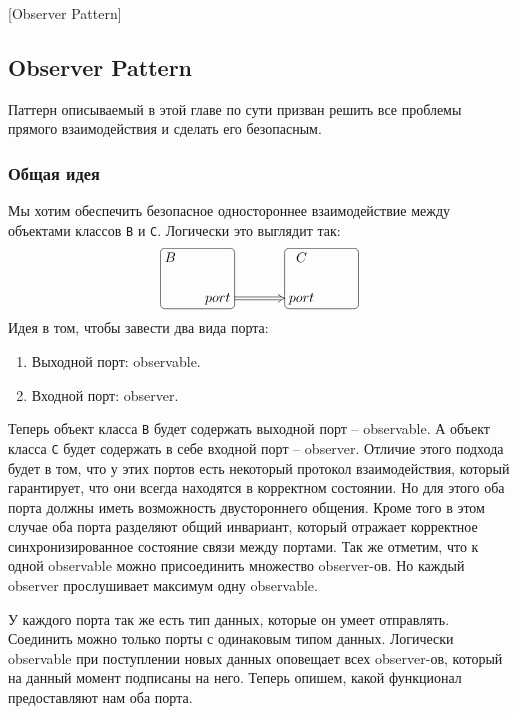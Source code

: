 [Observer Pattern]


\subsection{Observer Pattern}
\label{section::Observer}

Паттерн описываемый в этой главе по сути призван решить все проблемы прямого взаимодействия и сделать его безопасным.

\subsubsection{Общая идея}

Мы хотим обеспечить безопасное одностороннее взаимодействие между объектами классов \verb"B" и \verb"C".
Логически это выглядит так:
\[
\xymatrix@R=15pt@C=15pt{
	{B}
	{
	\save
   [].[rd]*[F-:<3pt>]\frm{}
   \restore
	}
	&{}&{}&{C}
	&{\phantom{C}}\\
	{}&{port}\ar@{=>}[rr]%
	&{}&{port}
	{
	\save
   [].[ru]*[F-:<3pt>]\frm{}
   \restore
	}	
	&{}\\
}
\]
Идея в том, чтобы завести два вида порта:
\begin{enumerate}
\item Выходной порт: observable.

\item Входной порт: observer.
\end{enumerate}
Теперь объект класса \verb"B" будет содержать выходной порт -- observable.
А объект класса \verb"C" будет содержать в себе входной порт -- observer.
Отличие этого подхода будет в том, что у этих портов есть некоторый протокол взаимодействия, который гарантирует, что они всегда находятся в корректном состоянии.
Но для этого оба порта должны иметь возможность двустороннего общения.
Кроме того в этом случае оба порта разделяют общий инвариант, который отражает корректное синхронизированное состояние связи между портами.
Так же отметим, что к одной observable можно присоединить множество observer-ов.
Но каждый observer прослушивает максимум одну observable.

У каждого порта так же есть тип данных, которые он умеет отправлять.
Соединить можно только порты с одинаковым типом данных.
Логически observable при поступлении новых данных оповещает всех observer-ов, который на данный момент подписаны на него.
Теперь опишем, какой функционал предоставляют нам оба порта.

